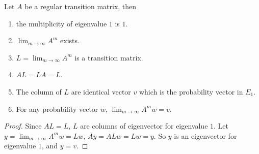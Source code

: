 \begin{theorem}
    Let $A$ be a regular transition matrix, then
    \begin{enumerate}
        \item the multiplicity of eigenvalue $1$ is $1$.
        \item $\displaystyle \lim_{m \rightarrow \infty} A^m$ exists.
        \item $L = \displaystyle \lim_{m \rightarrow \infty} A^m$ is a transition matrix.
        \item $AL = LA = L$.
        \item The column of $L$ are identical vector $v$ which is the probability vector in $E_1$.
        \item For any probability vector $w$, $\displaystyle \lim_{m \rightarrow \infty} A^m w = v$.
    \end{enumerate}    
\end{theorem}
\begin{proof}
    Since $AL = L$, $L$ are columns of eigenvector for eigenvalue $1$. Let $y = \displaystyle \lim_{m \rightarrow \infty} A^m w = Lw$, $Ay = ALw = Lw = y$. So $y$ is an eigenvector for eigenvalue $1$, and $y = v$.
\end{proof}












































